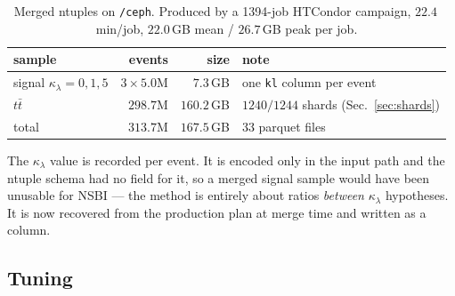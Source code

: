 \documentclass[11pt,a4paper]{article}
\newcommand{\kl}{\kappa_{\lambda}}
\begin{document}
\begin{table}[htbp]
\centering\small
\begin{tabular}{lrrl}
\toprule
sample & events & size & note \\
\midrule
signal $\kl=0,1,5$ & $3\times5.0$M & $7.3\,$GB & one \texttt{kl} column per event \\
$t\bar t$          & $298.7$M      & $160.2\,$GB & $1240/1244$ shards (Sec.~\ref{sec:shards}) \\
\midrule
total              & $313.7$M      & $167.5\,$GB & 33 parquet files \\
\bottomrule
\end{tabular}
\caption{Merged ntuples on \texttt{/ceph}. Produced by a 1394-job HTCondor campaign,
$22.4\,$min/job, $22.0\,$GB mean / $26.7\,$GB peak per job.\label{tab:production}}
\end{table}

The $\kl$ value is recorded per event. It is encoded only in the input path and the
ntuple schema had no field for it, so a merged signal sample would have been unusable for
NSBI --- the method is entirely about ratios \emph{between} $\kl$ hypotheses. It is now
recovered from the production plan at merge time and written as a column.

\subsection{Tuning}
\end{document}
